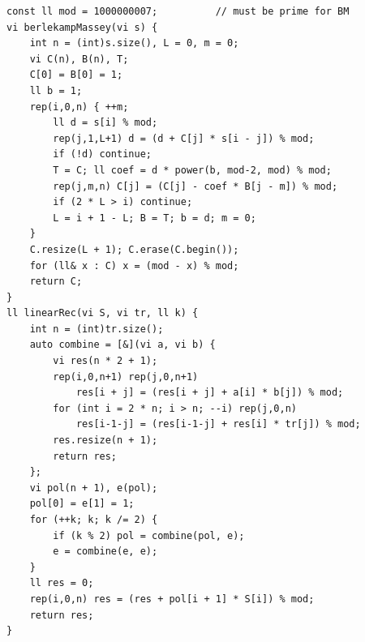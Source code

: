 \begin{lstlisting}
const ll mod = 1000000007;          // must be prime for BM
vi berlekampMassey(vi s) {
    int n = (int)s.size(), L = 0, m = 0;
    vi C(n), B(n), T;
    C[0] = B[0] = 1;
    ll b = 1;
    rep(i,0,n) { ++m;
        ll d = s[i] % mod;
        rep(j,1,L+1) d = (d + C[j] * s[i - j]) % mod;
        if (!d) continue;
        T = C; ll coef = d * power(b, mod-2, mod) % mod;
        rep(j,m,n) C[j] = (C[j] - coef * B[j - m]) % mod;
        if (2 * L > i) continue;
        L = i + 1 - L; B = T; b = d; m = 0;
    }
    C.resize(L + 1); C.erase(C.begin());
    for (ll& x : C) x = (mod - x) % mod;
    return C;
}
ll linearRec(vi S, vi tr, ll k) {
    int n = (int)tr.size();
    auto combine = [&](vi a, vi b) {
        vi res(n * 2 + 1);
        rep(i,0,n+1) rep(j,0,n+1)
            res[i + j] = (res[i + j] + a[i] * b[j]) % mod;
        for (int i = 2 * n; i > n; --i) rep(j,0,n)
            res[i-1-j] = (res[i-1-j] + res[i] * tr[j]) % mod;
        res.resize(n + 1);
        return res;
    };
    vi pol(n + 1), e(pol);
    pol[0] = e[1] = 1;
    for (++k; k; k /= 2) {
        if (k % 2) pol = combine(pol, e);
        e = combine(e, e);
    }
    ll res = 0;
    rep(i,0,n) res = (res + pol[i + 1] * S[i]) % mod;
    return res;
}
\end{lstlisting}


